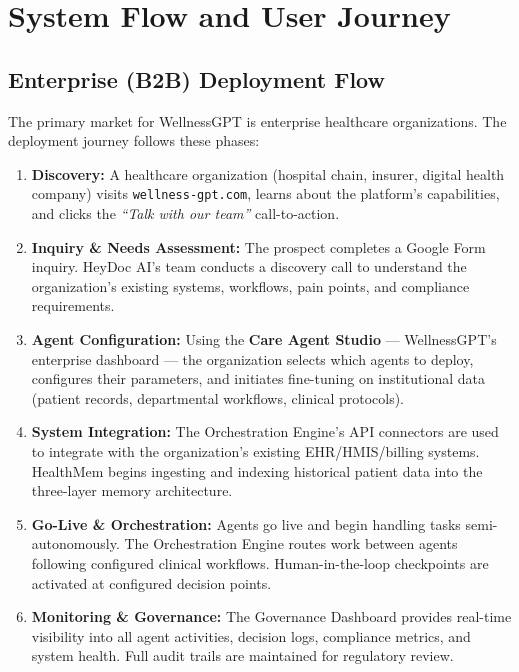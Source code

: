 \documentclass[12pt,a4paper]{article}
\begin{document}
\newpage

\section{System Flow and User Journey}

\subsection{Enterprise (B2B) Deployment Flow}

The primary market for WellnessGPT is enterprise healthcare organizations. The deployment journey follows these phases:

\begin{enumerate}
    \item \textbf{Discovery:} A healthcare organization (hospital chain, insurer, digital health company) visits \texttt{wellness-gpt.com}, learns about the platform's capabilities, and clicks the \emph{``Talk with our team''} call-to-action.

    \item \textbf{Inquiry \& Needs Assessment:} The prospect completes a Google Form inquiry. HeyDoc AI's team conducts a discovery call to understand the organization's existing systems, workflows, pain points, and compliance requirements.

    \item \textbf{Agent Configuration:} Using the \textbf{Care Agent Studio} — WellnessGPT's enterprise dashboard — the organization selects which agents to deploy, configures their parameters, and initiates fine-tuning on institutional data (patient records, departmental workflows, clinical protocols).

    \item \textbf{System Integration:} The Orchestration Engine's API connectors are used to integrate with the organization's existing EHR/HMIS/billing systems. HealthMem begins ingesting and indexing historical patient data into the three-layer memory architecture.

    \item \textbf{Go-Live \& Orchestration:} Agents go live and begin handling tasks semi-autonomously. The Orchestration Engine routes work between agents following configured clinical workflows. Human-in-the-loop checkpoints are activated at configured decision points.

    \item \textbf{Monitoring \& Governance:} The Governance Dashboard provides real-time visibility into all agent activities, decision logs, compliance metrics, and system health. Full audit trails are maintained for regulatory review.
\end{enumerate}
\end{document}
